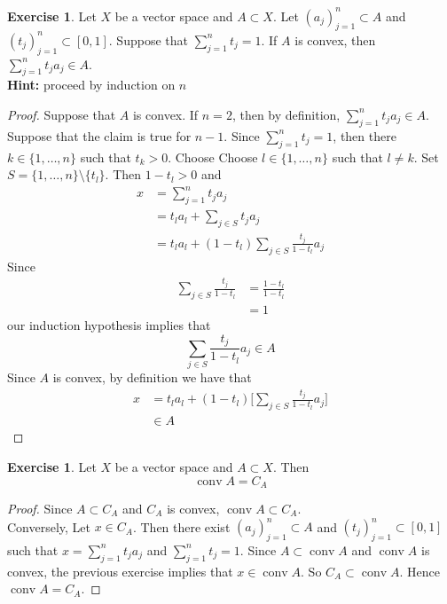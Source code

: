 \documentclass[12pt]{amsart}
\theoremstyle{definition}
\newtheorem{ex}[definition]{Exercise}
\newcommand{\tbf}[1]{\textbf{#1}}
\DeclareMathOperator{\cnv}{conv}
\DeclareMathOperator*{\0}{\mbf{0}}
\DeclareMathOperator*{\1}{\mbf{1}}
\begin{document}
	\begin{ex}
		Let $X$ be a vector space and $A \subset X$. Let $(a_j)_{j=1}^n \subset A$ and $(t_j)_{j=1}^n \subset [0,1]$. Suppose that $\sum\limits_{j=1}^n t_j = 1$. If $A$ is convex, then $\sum\limits_{j=1}^n t_ja_j \in A$.\\
		\tbf{Hint:} proceed by induction on $n$
	\end{ex}
	

	\begin{proof}
		Suppose that $A$ is convex. If $n = 2$, then by definition, $\sum\limits_{j=1}^n t_ja_j \in A$. \\
		Suppose that the claim is true for $n - 1$. Since $\sum\limits_{j=1}^n t_j = 1$, then there $k \in \{1, \ldots, n\}$ such that $t_k > 0$. Choose Choose $l \in \{1, \ldots, n\}$ such that $l \neq k$. Set $S = \{1, \ldots, n\} \setminus \{t_l\}$. Then $1 - t_l >0$ and  
		\begin{align*}
			x
			&= \sum\limits_{j=1}^n t_j a_j \\
			&= t_l a_l + \sum_{j \in S} t_ja_j \\
			&= t_la_l + (1-t_l) \sum_{j \in S} \frac{t_j}{1 - t_l}a_j
		\end{align*}
		Since 
		\begin{align*}
			\sum_{j \in S} \frac{t_j}{1-t_l} 
			&= \frac{1-t_l}{1-t_l} \\
			&= 1
		\end{align*}
		our induction hypothesis implies that 
		$$\sum\limits_{j \in S} \frac{t_j}{1-t_l} a_j \in A$$ 
		Since $A$ is convex, by definition we have that 
		\begin{align*}
			x 
			&= t_la_l + (1-t_l) \bigg[ \sum_{j \in S} \frac{t_j}{1 - t_l}a_j \bigg] \\
			& \in A
		\end{align*}
	\end{proof}

	\begin{ex}
		Let $X$ be a vector space and $A \subset X$. Then 
		$$\cnv A = C_A$$
	\end{ex}

	\begin{proof}
	Since $A \subset C_A$ and $C_A$ is convex, $\cnv A \subset C_A$. \\
	Conversely, Let $x \in C_A$. Then there exist $(a_j)_{j=1}^n \subset A$ and $(t_j)_{j=1}^n \subset [0,1]$ such that $x = \sum\limits_{j=1}^n t_j a_j$ and $\sum\limits_{j=1}^n t_j = 1$. Since $A \subset \cnv A$ and $\cnv A$ is convex, the previous exercise implies that $x \in \cnv A$. So $C_A \subset \cnv A$. Hence $\cnv A = C_A$.
	\end{proof}
\end{document}
